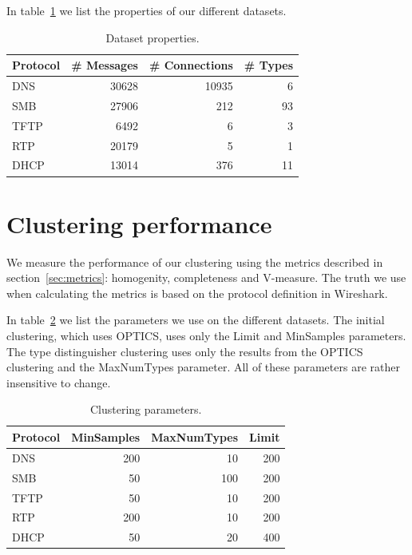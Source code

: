 \documentclass[a4paper]{report}
\begin{document}
In table~\ref{tab:datasets} we list the properties of our different datasets.


\begin{table}[h]
    \centering
    \captionsetup{width=0.8\textwidth}
    \caption{Dataset properties.}
    \begin{tabular}{| l | r | r | r |}
        \hline
        \textbf{Protocol}&\textbf{\# Messages}&\textbf{\# Connections}&\textbf{\# Types}\\ \hline
        DNS         & 30628         & 10935         & 6         \\ \hline
        SMB         & 27906         & 212           & 93        \\ \hline
        TFTP        & 6492          & 6             & 3         \\ \hline
        RTP         & 20179         & 5             & 1         \\ \hline
        DHCP        & 13014         & 376           & 11        \\ \hline
    \end{tabular}
    \label{tab:datasets}
\end{table}

\section{Clustering performance}
\label{sec:clustperf}
We measure the performance of our clustering using the metrics described in
section~\ref{sec:metrics}: homogenity, completeness and V-measure. The truth we
use when calculating the metrics is based on the protocol definition in
Wireshark.

In table~\ref{tab:clusterparams} we list the parameters we use on the
different datasets. The initial clustering, which uses OPTICS, uses only the
Limit and MinSamples parameters. The type distinguisher clustering uses only
the results from the OPTICS clustering and the MaxNumTypes parameter. All of
these parameters are rather insensitive to change.

\begin{table}[h]
    \centering
    \captionsetup{width=0.8\textwidth}
    \caption{Clustering parameters.}
    \begin{tabular}{| l | r | r | r |}
        \hline
        \textbf{Protocol}&\textbf{MinSamples}&\textbf{MaxNumTypes}&\textbf{Limit} \\ \hline
        DNS & 200 & 10 & 200 \\ \hline
        SMB & 50 & 100 & 200 \\ \hline
        TFTP & 50 & 10 & 200 \\ \hline
        RTP & 200 & 10 & 200 \\ \hline
        DHCP & 50 & 20 & 400 \\ \hline
    \end{tabular}
    \label{tab:clusterparams}
\end{table}
\end{document}

